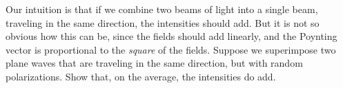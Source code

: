 Our intuition is that if we combine two beams of light into a single beam, traveling
in the same direction, the intensities should add. But it is not so obvious how this
can be, since the fields should add linearly, and the Poynting vector is proportional
to the \emph{square} of the fields. Suppose we superimpose two plane waves that are 
traveling in the same direction, but with random polarizations. Show that, on the average,
the intensities do add.
